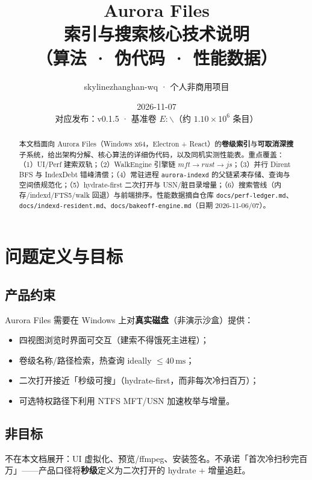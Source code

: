 \documentclass[UTF8,a4paper,11pt]{ctexart}
\title{\textbf{Aurora Files}\\[0.35em]
\large 索引与搜索核心技术说明\\[0.2em]
\normalsize（算法 · 伪代码 · 性能数据）}
\author{skylinezhanghan-wq · 个人非商用项目}
\date{2026-11-07 \\ 对应发布：v0.1.5 · 基准卷 $E{:}\backslash$（约 $1.10\times 10^{6}$ 条目）}
\begin{document}
\maketitle
\begin{abstract}
本文档面向 Aurora Files（Windows x64，Electron + React）的\textbf{卷级索引}与\textbf{可取消深搜}子系统，给出架构分解、核心算法的详细伪代码，以及同机实测性能表。重点覆盖：（1）UI/Perf 建索双轨；（2）WalkEngine 引擎链 $mft\to rust\to js$；（3）并行 Dirent BFS 与 IndexDebt 错峰清偿；（4）常驻进程 \texttt{aurora-indexd} 的父链紧凑存储、查询与空间债规范化；（5）hydrate-first 二次打开与 USN/脏目录增量；（6）搜索管线（内存/indexd/FTS5/walk 回退）与前端排序。性能数据摘自仓库 \texttt{docs/perf-ledger.md}、\texttt{docs/indexd-resident.md}、\texttt{docs/bakeoff-engine.md}（日期 2026-11-06/07）。
\end{abstract}

\tableofcontents
\newpage

\section{问题定义与目标}

\subsection{产品约束}
Aurora Files 需要在 Windows 上对\textbf{真实磁盘}（非演示沙盒）提供：
\begin{itemize}[leftmargin=1.6em]
  \item 四视图浏览时界面可交互（建索不得饿死主进程）；
  \item 卷级名称/路径检索，热查询 ideally $\le 40\,\mathrm{ms}$；
  \item 二次打开接近「秒级可搜」（hydrate-first，而非每次冷扫百万）；
  \item 可选特权路径下利用 NTFS MFT/USN 加速枚举与增量。
\end{itemize}

\subsection{非目标}
不在本文档展开：UI 虚拟化、预览/ffmpeg、安装签名。不承诺「首次冷扫秒完百万」——产品口径将\textbf{秒级}定义为二次打开的 hydrate + 增量追赶。
\end{document}
